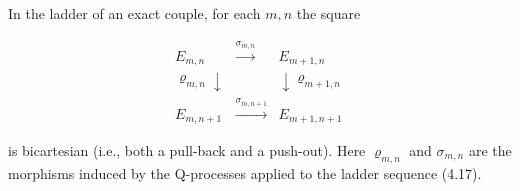 In the ladder of an exact couple, for each $m, n$ the square

$$\begin{array}{ccc}
E_{m,n} & \xrightarrow{\sigma_{m,n}} & E_{m+1,n} \\
\varrho_{m,n} \downarrow & & \downarrow \varrho_{m+1,n} \\
E_{m,n+1} & \xrightarrow{\sigma_{m,n+1}} & E_{m+1,n+1}
\end{array}$$

is bicartesian (i.e., both a pull-back and a push-out). Here $\varrho_{m,n}$ and $\sigma_{m,n}$ are the morphisms induced by the Q-processes applied to the ladder sequence (4.17).
